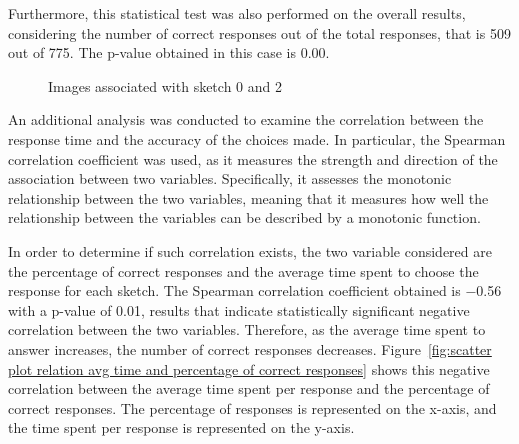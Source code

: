 \noindent Furthermore, this statistical test was also performed on the overall results, considering the number of correct responses out of the total responses, that is \num{509} out of \num{775}. The p-value obtained in this case is \num{0.00}.\\
\begin{figure}[!ht]
    \centering
     \quad
    \caption{Images associated with sketch \num{0} and \num{2}}
    \label{fig:similar images sketch 0 and 2}
\end{figure}

\noindent An additional analysis was conducted to examine the correlation between the response time and the accuracy of the choices made. 
In particular, the Spearman correlation coefficient was used, as it measures the strength and direction of the association between two variables. Specifically, it assesses the monotonic relationship between the two variables, meaning that it measures how well the relationship between the variables can be described by a monotonic function. 

\noindent In order to determine if such correlation exists, the two variable considered are the percentage of correct responses and the average time spent to choose the response for each sketch. The Spearman correlation coefficient obtained is \num{-0.56} with a p-value of \num{0.01}, results that indicate statistically significant negative correlation between the two variables. Therefore, as the average time spent to answer increases, the number of correct responses decreases.
Figure~\ref{fig:scatter plot relation avg time and percentage of correct responses} shows this negative correlation between the average time spent per response and the percentage of correct responses. The percentage of responses is represented on the x-axis, and the time spent per response is represented on the y-axis.

